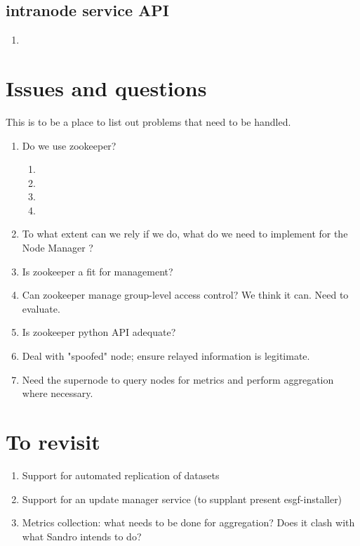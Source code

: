 \documentclass[oneside,12pt]{memoir}
\def\nm{Node Manager{ }}
\begin{document}
\subsection{intranode service API}


\begin{enumerate}
\item
\end{enumerate}



\section{Issues and questions}
This is to be a place to list out problems that need to be handled.
\begin{enumerate}
\item
Do we use zookeeper?
\begin{enumerate}
\item {}
\item {}
\item {}
\item {} 
\end{enumerate}
\item
To what extent can we rely if we do,  what do we need to implement for the \nm?
\item

Is zookeeper a fit for management?
\item
Can zookeeper manage group-level access control?  We think it can.  Need to evaluate.
\item
Is zookeeper python API adequate?

\item
Deal with "spoofed" node; ensure relayed information is legitimate. 
\item
Need the supernode to query nodes for metrics and perform aggregation where necessary.

\end{enumerate}
\section{To revisit}
\begin{enumerate}
\item Support for automated replication of datasets
\item Support for an update manager service (to supplant present esgf-installer)
\item Metrics collection: what needs to be done for aggregation? Does it clash with what Sandro intends to do?
\end{enumerate}
\printbibliography
\hypertarget{mymarker}{}
\printindex
\end{document}
